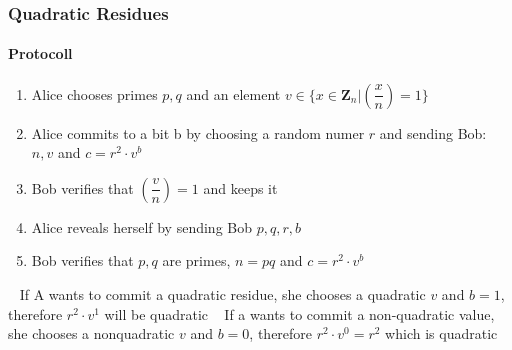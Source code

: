 \begin{frame}
	\frametitle{Quadratic Residues}
	\framesubtitle{Protocoll}
	\begin{LARGE}
		\begin{enumerate}
			\item Alice chooses primes $p,q$ and an element $v \in \{ x \in \mathbf{Z}_n | (\dfrac{x}{n}) = 1\}$ 
			\item Alice commits to a bit b by choosing a random numer $r$ and sending Bob: $n,v$ and $c = r^2\cdot v^b$
			\item Bob verifies that $(\dfrac{v}{n})=1$ and keeps it
			\item Alice reveals herself by sending Bob $p,q,r,b$
			\item Bob verifies that $p,q$ are primes, $n=pq$ and $c=r^2\cdot v^b$ 
		\end{enumerate}
	\end{LARGE}
~\newline
If A wants to commit a quadratic residue, she chooses a quadratic $v$ and $b=1$, therefore $r^2 \cdot v^1$ will be quadratic ~\newline
If a wants to commit a non-quadratic value, she chooses a nonquadratic $v$ and $b=0$, therefore $r^2 \cdot v^0 = r^2$ which is quadratic
\end{frame}